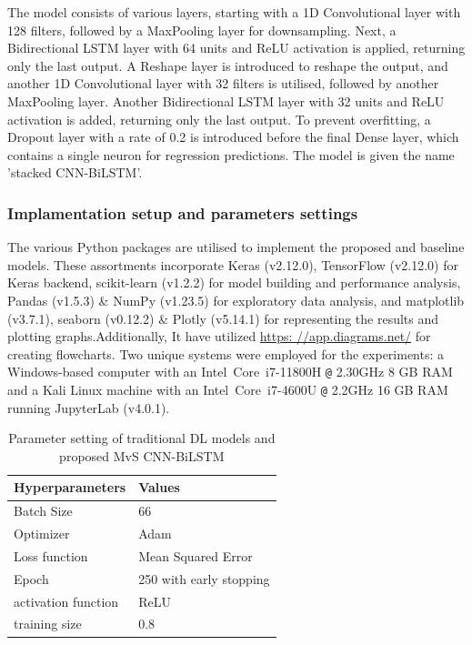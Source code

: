 \documentclass[a4paper, fleqn]{cas-sc}
\theoremstyle{definition}
\theoremstyle{remark}
\begin{document}
The model consists of various layers,  starting with a 1D Convolutional layer with 128 filters,  followed by a MaxPooling layer for downsampling. Next,  a Bidirectional LSTM layer with 64 units and ReLU activation is applied,  returning only the last output. A Reshape layer is introduced to reshape the output, and another 1D Convolutional layer with 32 filters is utilised,  followed by another MaxPooling layer. Another Bidirectional LSTM layer with 32 units and ReLU activation is added, returning only the last output. To prevent overfitting,  a Dropout layer with a rate of 0.2 is introduced before the final Dense layer,  which contains a single neuron for regression predictions. The model is given the name 'stacked CNN-BiLSTM'.

\subsubsection{Implamentation setup and parameters settings}
The various Python packages are utilised to implement the proposed and baseline models. These assortments incorporate Keras (v2.12.0),  TensorFlow (v2.12.0) for Keras backend, scikit-learn (v1.2.2) for model building and performance analysis,  Pandas (v1.5.3) \& NumPy (v1.23.5) for exploratory data analysis,  and matplotlib (v3.7.1),  seaborn (v0.12.2) \& Plotly (v5.14.1) for representing the results and plotting graphs.Additionally,  It have utilized \href{https: //app.diagrams.net/}{https: //app.diagrams.net/} for creating flowcharts. Two unique systems were employed for the experiments:  a Windows-based computer with an Intel\textregistered ~Core\texttrademark ~i7-11800H \texttt{@} 2.30GHz 8 GB RAM and a Kali Linux machine with an Intel\textregistered ~Core\texttrademark ~i7-4600U \texttt{@} 2.2GHz 16 GB RAM running JupyterLab (v4.0.1).


\begin{table}[h!]
  \caption{Parameter setting of traditional DL models and proposed MvS CNN-BiLSTM }
  \label{tab: my-table}
  \begin{tabular}{ll}
  \hline Hyperparameters & Values        \\ \hline
  Batch Size               & 66                     \\
  Optimizer                 & Adam                   \\
  Loss function            & Mean Squared Error      \\
  Epoch                    & 250 with early stopping \\
  activation function      & ReLU                   \\
  training size             & 0.8                   \\ \hline
  \end{tabular}
  \end{table}
\end{document}
